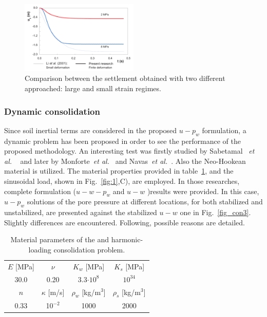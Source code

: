 \documentclass[twocolumn]{svjour3}          %
\newcommand{\etal}{
  \textit{et al.}
}
\begin{document}
\begin{figure}
  \includegraphics[width=0.5\textwidth]{Fig/borja2.pdf}
\caption{Comparison between the settlement obtained with two different approached: large and small strain regimes.}
\label{fig:6}      
\end{figure}

\subsubsection{Dynamic consolidation}
\label{sec:5:1:2}

Since soil inertial terms are considered in the proposed $u-p_w$ formulation, a dynamic problem has been proposed in order to see the performance of the proposed methodology. An interesting test was firstly studied by Sabetamal~\etal~\cite{Sabetamal:2015} and later by Monforte~\textit{et al.}~\cite{Monforte2019} and Navas~\textit{et al.}~\cite{Navas2016b,Navas2021}. Also the Neo-Hookean material is utilized. The material properties provided in table~\ref{tab:2}, and the sinusoidal load, shown in Fig.~\ref{fig:1},C), are employed. In those researches, complete formulation ($u-w-p_w$ and  $u-w$ )results were provided. In this case, $u-p_w$ solutions of the pore pressure at different locations, for both stabilized and unstabilized, are presented against the stabilized $u-w$ one in Fig.~\ref{fig_con3}. Slightly differences are encountered. Following, possible reasons are detailed.

\begin{table}[!t]
\centering
\caption{ Material parameters of the and harmonic-loading consolidation problem.} \label{tab:2}
	\vspace*{0.2cm}
	\begin{tabular}{cccc}
$E$ [MPa] & $\nu$ & $K_w$ [MPa] & $K_s$ [MPa] \\
		\noalign{\smallskip}\hline\noalign{\smallskip}
	 30.0& 0.20 & 3.3$\cdot 10^8$ & $10^{34}$ \\
	 \noalign{\smallskip}\hline\hline\noalign{\smallskip}
	  $n$ & $\kappa$ [m/s] & $\rho_w$ [kg/$\textrm{m}^3$] & $\rho_s$ [kg/$\textrm{m}^3$]\\
	  \noalign{\smallskip}\hline\noalign{\smallskip}
	  0.33  & 10$^{-2} $& 1000 & 2000
	\end{tabular}
\end{table}
\end{document}
